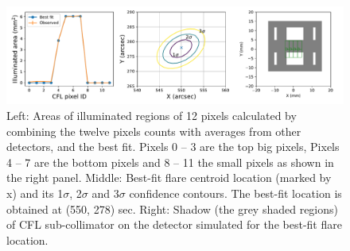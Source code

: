 \documentclass[referee]{aa} %
\begin{document}
\begin{figure}
  \centering
  \includegraphics[width=0.95\linewidth]{figures/cflMay07.pdf}
  \caption{
   Left: Areas of illuminated regions of 12 pixels calculated by combining
  the twelve pixels counts with averages from other detectors, and the best fit. 
  Pixels 0 -- 3 are the top big pixels, Pixels 4 -- 7 are the bottom pixels and 8 -- 11 the small pixels as shown in the right panel.
   Middle: Best-fit flare centroid location (marked by x) and its 1$\sigma$, 2$\sigma$ and 3$\sigma$ confidence contours.
   The best-fit location is obtained at (550, 278) sec. 
    Right:  Shadow (the grey shaded regions) of CFL sub-collimator on the detector 
  simulated for the best-fit flare location. }
  \label{fig:cfl}
\end{figure}
\end{document}
